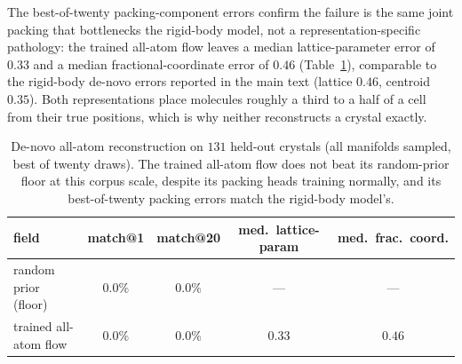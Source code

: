 \documentclass[11pt]{article}
\begin{document}
The best-of-twenty packing-component errors confirm the failure is the same joint
packing that bottlenecks the rigid-body model, not a representation-specific
pathology: the trained all-atom flow leaves a median lattice-parameter error of
$0.33$ and a median fractional-coordinate error of $0.46$ (Table~\ref{tab:allatom}),
comparable to the rigid-body de-novo errors reported in the main text (lattice
$0.46$, centroid $0.35$). Both representations place molecules roughly a third to a
half of a cell from their true positions, which is why neither reconstructs a
crystal exactly.

\begin{table}[h]
\centering
\caption{De-novo all-atom reconstruction on $131$ held-out crystals (all manifolds
sampled, best of twenty draws). The trained all-atom flow does not beat its
random-prior floor at this corpus scale, despite its packing heads training
normally, and its best-of-twenty packing errors match the rigid-body model's.}
\label{tab:allatom}
\begin{tabular}{lcccc}
\toprule
field & match@1 & match@20 & med.\ lattice-param & med.\ frac.\ coord. \\
\midrule
random prior (floor)   & $0.0\%$ & $0.0\%$ & --- & --- \\
trained all-atom flow  & $0.0\%$ & $0.0\%$ & $0.33$ & $0.46$ \\
\bottomrule
\end{tabular}
\end{table}



\end{document}
